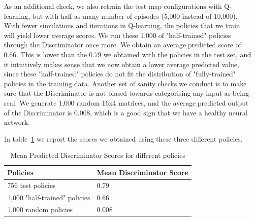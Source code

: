 As an additional check, we also retrain the test map configurations with Q-learning, but with half as many number of episodes (5,000 instead of 10,000). With fewer simulations and iterations in Q-learning, the policies that we train will yield lower average scores. We run these 1,000 of "half-trained" policies through the Discriminator once more. We obtain an average predicted score of 0.66. This is lower than the 0.79 we obtained with the policies in the test set, and it intuitively makes sense that we now obtain a lower average predicted value, since these "half-trained" policies do not fit the distribution of "fully-trained" policies in the training data.
Another set of sanity checks we conduct is to make sure that the Discriminator is not biased towards categorising any input as being real. We generate 1,000 random 16x4 matrices, and the average predicted output of the Discriminator is 0.008, which is a good sign that we have a healthy neural network.

In table~\ref{table:discrim_scores} we report the scores we obtained using these three different policies.

\begin{table}[H]
	\begin{tabular}{@{}ll@{}}
\toprule
Policies                      & Mean Discriminator Score \\ \midrule
756 test policies             & 0.79                               \\
1,000 "half-trained" policies & 0.66                               \\
1,000 random policies         & 0.008                              \\ \bottomrule
\end{tabular}
\caption{Mean Predicted Discriminator Scores for different policies}
\label{table:discrim_scores}
\end{table}